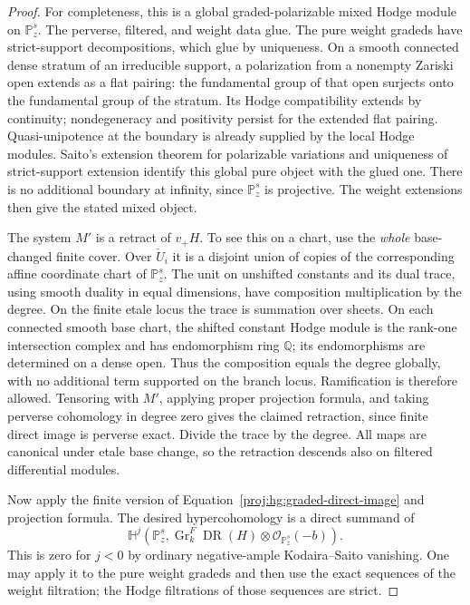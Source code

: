 \documentclass[11pt,letterpaper]{article}
\newcommand{\Q}{\mathbb{Q}}
\newcommand{\PP}{\mathbb{P}}
\newcommand{\OO}{\mathcal{O}}
\DeclareMathOperator{\Gr}{Gr}
\DeclareMathOperator{\DR}{DR}
\theoremstyle{definition}
\theoremstyle{remark}
\begin{document}
\begin{proof}
For completeness, this is a global graded-polarizable mixed Hodge
module on \(\PP^s_z\).  The perverse, filtered, and weight data glue.
The pure weight gradeds have strict-support decompositions, which
glue by uniqueness.  On a smooth connected dense stratum of an
irreducible support, a polarization from a nonempty Zariski open
extends as a flat pairing: the fundamental group of that open
surjects onto the fundamental group of the stratum.  Its Hodge
compatibility extends by continuity; nondegeneracy and positivity
persist for the extended flat pairing.  Quasi-unipotence at the
boundary is already supplied by the local Hodge modules.  Saito's
extension theorem for polarizable variations
\cite[Section~3.b]{Proj-Saito1990} and uniqueness of strict-support
extension identify this global pure object with the glued one.
There is no additional boundary at infinity, since \(\PP^s_z\) is
projective.  The weight extensions then give the stated mixed
object.

The system \(M'\) is a retract of \(v_+H\).  To see this on a chart,
use the \emph{whole} base-changed finite cover.  Over \(\check U_i\)
it is a disjoint union of copies of the corresponding affine
coordinate chart of \(\PP^s_z\).  The unit on unshifted constants
and its dual trace, using smooth duality in equal dimensions, have
composition multiplication by the degree.  On the finite etale
locus the trace is summation over sheets.  On each connected
smooth base chart, the shifted constant Hodge module is the
rank-one intersection complex and has endomorphism ring \(\Q\);
its endomorphisms are determined on a dense open.  Thus the
composition equals the degree globally, with no additional term
supported on the branch locus.  Ramification is therefore
allowed.  Tensoring with \(M'\), applying proper
projection formula, and taking perverse cohomology in degree zero
gives the claimed retraction, since finite direct image is
perverse exact.  Divide the trace by the degree.  All maps are
canonical under etale base change, so the retraction descends also
on filtered differential modules.

Now apply the finite version of
Equation~\eqref{proj:hg:graded-direct-image} and projection formula.
The desired hypercohomology is a direct summand of
\[
 \mathbb H^j\!\left(
   \PP^s_z,\Gr^F_k\DR(H)\otimes\OO_{\PP^s_z}(-b)
 \right).
\]
This is zero for \(j<0\) by ordinary negative-ample
Kodaira--Saito vanishing.  One may apply it to the pure weight
gradeds and then use the exact sequences of the weight filtration;
the Hodge filtrations of those sequences are strict.
\end{proof}
\end{document}
